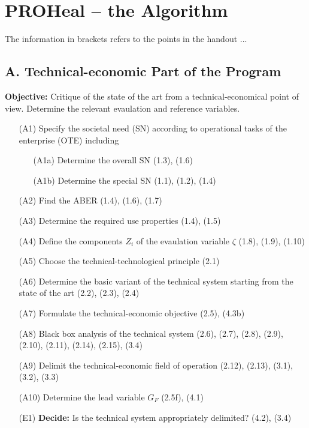 \documentclass[11pt,a4paper]{article}
\begin{document}
\section{PROHeal -- the Algorithm} 

The information in brackets refers to the points in the handout ...

\subsection*{A. Technical-economic Part of the Program}

\textbf{Objective:} Critique of the state of the art from a
technical-economical point of view. Determine the relevant evaulation and
reference variables.

\begin{itemize}[leftmargin=30pt]
\item[(A1)] Specify the societal need (SN) according to operational tasks
  of the enterprise (OTE) including
  \begin{itemize}[leftmargin=20pt,noitemsep]
  \item[(A1a)] Determine the overall SN (1.3), (1.6) 
  \item[(A1b)] Determine the special SN (1.1), (1.2), (1.4)
  \end{itemize}
\item[(A2)] Find the ABER (1.4), (1.6), (1.7)
\item[(A3)] Determine the required use properties (1.4), (1.5) 
\item[(A4)] Define the components $Z_i$ of the evaulation variable $\zeta$
  (1.8), (1.9), (1.10)
\item[(A5)] Choose the technical-technological principle (2.1)
\item[(A6)] Determine the basic variant of the technical system starting from
  the state of the art (2.2), (2.3), (2.4)
\item[(A7)] Formulate the technical-economic objective (2.5), (4.3b)
\item[(A8)] Black box analysis of the technical system (2.6), (2.7), (2.8),
  (2.9), (2.10), (2.11), (2.14), (2.15), (3.4)
\item[(A9)] Delimit the technical-economic field of operation (2.12), (2.13),
  (3.1), (3.2), (3.3)
\item[(A10)] Determine the lead variable $G_F$ (2.5f), (4.1)
\item[(E1)] \textbf{Decide:} Is the technical system appropriately delimited?
  (4.2), (3.4)
  \begin{itemize}[leftmargin=20pt,noitemsep]

\end{itemize}
\end{itemize}
\end{document}
